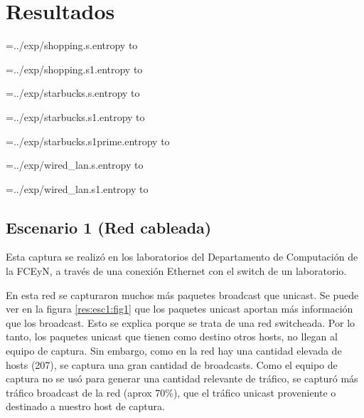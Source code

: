 
\section{Resultados}

\newread\tmp

\openin\tmp=../exp/shopping.s.entropy
\read\tmp to \ShoppingSEntropy
\closein\tmp

\openin\tmp=../exp/shopping.s1.entropy
\read\tmp to \ShoppingSOneEntropy
\closein\tmp

\openin\tmp=../exp/starbucks.s.entropy
\read\tmp to \StarbucksSEntropy
\closein\tmp

\openin\tmp=../exp/starbucks.s1.entropy
\read\tmp to \StarbucksSOneEntropy
\closein\tmp

\openin\tmp=../exp/starbucks.s1prime.entropy
\read\tmp to \StarbucksSOnePrimeEntropy
\closein\tmp

\openin\tmp=../exp/wired_lan.s.entropy
\read\tmp to \WiredLanSEntropy
\closein\tmp

\openin\tmp=../exp/wired_lan.s1.entropy
\read\tmp to \WiredLanSOneEntropy
\closein\tmp

\subsection{Escenario 1 (Red cableada)}

Esta captura se realizó en los laboratorios del Departamento de Computación de la FCEyN, a través de una conexión Ethernet con el switch de un laboratorio.

En esta red se capturaron muchos más paquetes broadcast que unicast. Se puede ver en la figura \ref{res:esc1:fig1}
que los paquetes unicast aportan más información que los broadcast. Esto se explica porque se trata de una red switcheada. Por lo tanto, los paquetes unicast que tienen como destino otros hosts, no llegan al equipo de captura. Sin embargo, como en la red hay una cantidad elevada de hosts (207), se captura una gran cantidad de broadcasts. Como el equipo de captura no se usó para generar una cantidad relevante de tráfico, se capturó más tráfico broadcast de la red (aprox 70\%), que el tráfico unicast proveniente o destinado a nuestro host de captura.



